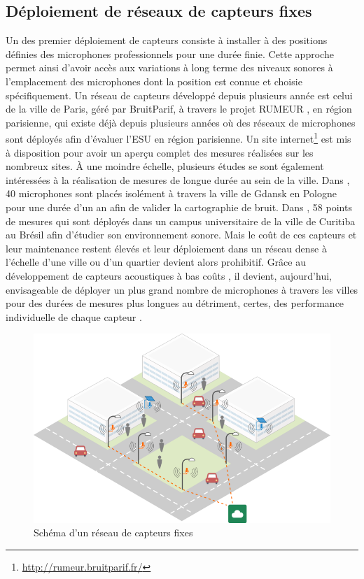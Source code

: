 \subsection{Déploiement de réseaux de capteurs fixes}

Un des premier déploiement de capteurs consiste à installer à des positions définies des microphones professionnels pour une durée finie. Cette approche permet ainsi d'avoir accès aux variations à long terme des niveaux sonores à l'emplacement des microphones dont la position est connue et choisie spécifiquement. Un réseau de capteurs développé depuis plusieurs année est celui de la ville de Paris, géré par BruitParif, à travers le projet RUMEUR \cite{mietlicki2012innovative}, en région parisienne, qui existe déjà depuis plusieurs années où des réseaux de microphones sont déployés afin d'évaluer l'ESU en région parisienne. Un site internet\footnote{\url{http://rumeur.bruitparif.fr/}} est mis à disposition pour avoir un aperçu complet des mesures réalisées sur les nombreux sites. 
À une moindre échelle, plusieurs études se sont également intéressées à la réalisation de mesures de longue durée au sein de la ville. 
Dans \cite{Mioduszewski}, 40 microphones sont placés isolément à travers la ville de Gdansk en Pologne pour une durée d'un an afin de valider la cartographie de bruit. Dans \cite{zannin_characterization_2013}, 58 points de mesures qui sont déployés dans un campus universitaire de la ville de Curitiba au Brésil afin d'étudier son environnement sonore. Mais le coût de ces capteurs et leur maintenance restent élevés et leur déploiement dans un réseau dense à l'échelle d'une ville ou d'un quartier devient alors prohibitif. Grâce au développement de capteurs acoustiques à bas coûts \cite{van2010use}, il devient, aujourd'hui, envisageable de déployer un plus grand nombre de microphones à travers les villes pour des durées de mesures plus longues au détriment, certes, des performance individuelle de chaque capteur \cite{aumond2017study}. 

\begin{figure}[t]
\centering
\includegraphics[width=0.8\linewidth]{./figures/cartographie/reseau_mesure.png}
\caption{Schéma d'un réseau de capteurs fixes}
\label{fig:reseau_capteur}
\end{figure}

